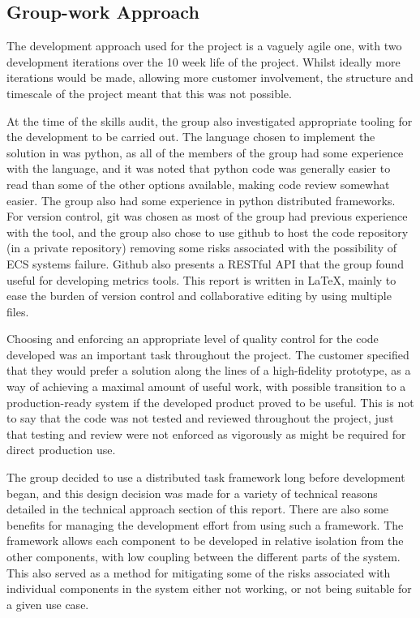 \subsection{Group-work Approach}
The development approach used for the project is a vaguely agile one, with two
development iterations over the 10 week life of the project. Whilst ideally more
iterations would be made, allowing more customer involvement, the
structure and timescale of the project meant that this was not possible. 

At the time of the skills audit, the group also investigated appropriate tooling
for the development to be carried out. The language chosen to implement the
solution in was python, as all of the members of the group had some experience
with the language, and it was noted that python code was generally easier to
read than some of the other options available, making code review somewhat
easier. The group also had some experience in python distributed frameworks.
For version control, git was chosen as most of the group had previous experience
with the tool, and the group also chose to use github to host the code
repository (in a private repository) removing some risks associated with the
possibility of ECS systems failure. Github also presents a RESTful API that the group
found useful for developing metrics tools. This report is written in LaTeX,
mainly to ease the burden of version control and collaborative editing by using
multiple files.

Choosing and enforcing an appropriate level of quality control for the code
developed was an important task throughout the project. The customer specified
that they would prefer a solution along the lines of a high-fidelity prototype,
as a way of achieving a maximal amount of useful work, with possible transition
to a production-ready system if the developed product proved to be useful. This
is not to say that the code was not tested and reviewed throughout the project,
just that testing and review were not enforced as vigorously as might be
required for direct production use.

The group decided to use a distributed task framework long before development
began, and this design decision was made for a variety of technical reasons
detailed in the technical approach section of this report. There are also some
benefits for managing the development effort from using such a framework. The
framework allows each component to be developed in relative isolation from the
other components, with low coupling between the different parts of the system.
This also served as a method for mitigating some of the risks associated with
individual components in the system either not working, or not being suitable
for a given use case.

